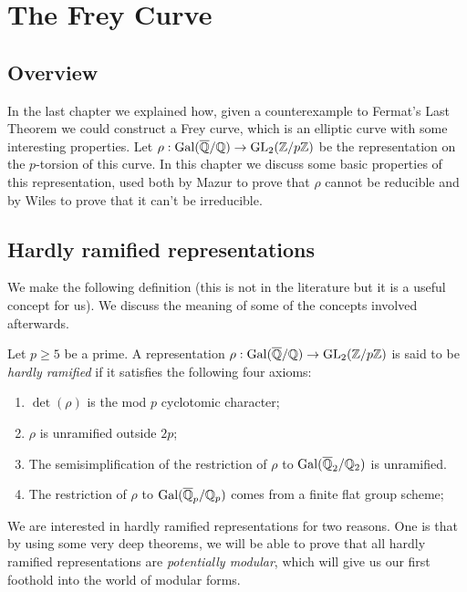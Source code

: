 \chapter{The Frey Curve}

\section{Overview}

In the last chapter we explained how, given a counterexample to Fermat's Last Theorem we could construct a Frey curve, which is an elliptic curve with some interesting properties. Let $\rho:\operatorname{Gal}(\overline{\mathbb{Q}}/\mathbb{Q})\to\operatorname{GL}_2(\mathbb{Z}/p\mathbb{Z})$ be the representation on the $p$-torsion of this curve. In this chapter we discuss some basic properties of this representation, used both by Mazur to prove that $\rho$ cannot be reducible and by Wiles to prove that it can't be irreducible.

\section{Hardly ramified representations}

We make the following definition (this is not in the literature but it is a useful concept for us). We discuss the meaning of some of the concepts involved afterwards.

\begin{definition}\label{hardly_ramified} Let $p\geq5$ be a prime. A representation $\rho: \operatorname{Gal}(\overline{\mathbb{Q}}/\mathbb{Q})\to \operatorname{GL}_2(\mathbb{Z}/p\mathbb{Z})$ is said to be \emph{hardly ramified} if it satisfies the following four axioms:
  \begin{enumerate}
  \item $\det(\rho)$ is the mod $p$ cyclotomic character;
  \item $\rho$ is unramified outside $2p$;
  \item The semisimplification of the restriction of $\rho$ to $\operatorname{Gal}(\overline{\mathbb{Q}}_2/\mathbb{Q}_2)$ is unramified.
  \item The restriction of $\rho$ to $\operatorname{Gal}(\overline{\mathbb{Q}}_p/\mathbb{Q}_p)$ comes from a finite flat group scheme;
  \end{enumerate}
\end{definition}

We are interested in hardly ramified representations for two reasons. One is that by using some very deep theorems, we will be able to prove that all hardly ramified representations are \emph{potentially modular}, which will give us our first foothold into the world of modular forms.

